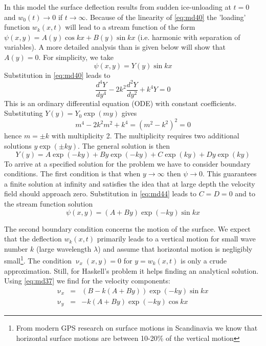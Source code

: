 In this model the surface deflection results from sudden ice-unloading at $t=0$ and
$w_0(t)\rightarrow 0$ if $t\rightarrow\infty$. 
Because of the linearity of \eqref{eq:md40} the 'loading' function $w_k(x,t)$ will
lead to a stream function of the form $\psi(x,y)=A(y) \cos kx + B(y) \sin kx$ (i.e. harmonic
with separation of variables). A more detailed analysis than is given below will show
that $A(y) =0$. For simplicity, we take
\begin{equation}
\psi(x,y)=Y(y) \sin kx
\label{eq:md42}
\end{equation}
Substitution in \eqref{eq:md40} leads to
\begin{equation}
\frac{d^4Y}{dy^4} - 2k^2 \frac{d^2Y}{dy^2} + k^4 Y = 0
\label{eq:md43}
\end{equation}
This is an ordinary differential equation (ODE) 
with constant coefficients. Substituting 
$Y(y)=Y_0 \exp (m y)$ gives 
\[
m^4 - 2k^2 m^2 + k^4 = (m^2-k^2)^2=0
\]
hence $m=\pm k$ with multiplicity 2.
The multiplicity requires two additional solutions $y \exp (\pm ky)$. The general solution is then
\begin{equation}
Y(y) = A \exp (-ky) + By \exp(-ky) + C \exp (ky) + Dy\exp (ky)
\label{eq:md44}
\end{equation}
To arrive at a specified solution for the problem we have to consider boundary
conditions. The first condition is that when $y\rightarrow\infty$ then $\psi\rightarrow 0$. 
This guarantees a finite
solution at infinity and satisfies the idea that at large depth the velocity field should
approach zero. Substitution in \eqref{eq:md44} leads to $C=D=0$ and to the stream function
solution
\begin{equation}
\psi(x,y) = (A+By )\exp (-ky) \sin kx 
\label{eq:md45}
\end{equation}

The second boundary condition concerns the motion of the surface. We expect that the
deflection $w_k(x,t)$ primarily leads to a vertical motion for small wave number $k$
(large wavelength $\lambda$) and assume that horizontal motion is negligibly small\footnote{From modern
GPS research on surface motions in Scandinavia we know that horizontal surface motions
are between 10-20\% of the vertical motion}. 
The condition $\upnu_x(x,y)=0$ for $y=w_k(x,t)$
is only a crude approximation. Still, for Haskell’s problem it helps finding an
analytical solution. Using \eqref{eq:md37} we find for the velocity components:
\begin{eqnarray}
\upnu_x &=& (B-k(A+By)) \exp (-ky) \sin kx \label{eq:md46a} \\
\upnu_y &=& -k(A+By) \exp (-ky) \cos kx \label{eq:md46b} 
\end{eqnarray}

